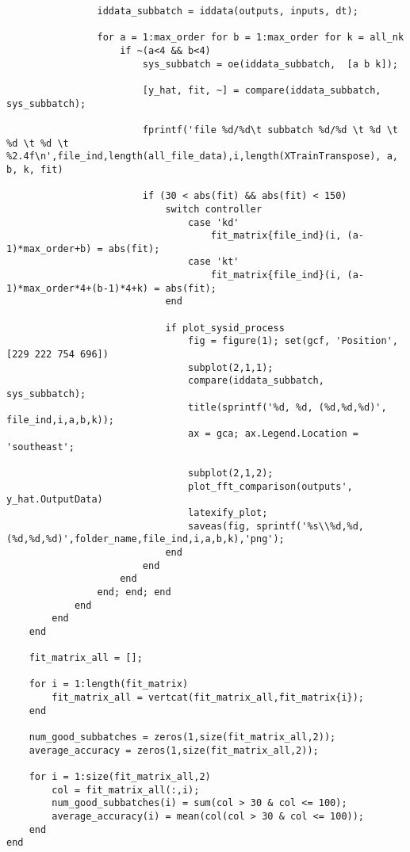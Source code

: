 \begin{lstlisting}
                iddata_subbatch = iddata(outputs, inputs, dt);
    
                for a = 1:max_order for b = 1:max_order for k = all_nk
                    if ~(a<4 && b<4)
                        sys_subbatch = oe(iddata_subbatch,  [a b k]);
    
                        [y_hat, fit, ~] = compare(iddata_subbatch, sys_subbatch);
    
                        fprintf('file %d/%d\t subbatch %d/%d \t %d \t %d \t %d \t %2.4f\n',file_ind,length(all_file_data),i,length(XTrainTranspose), a, b, k, fit)
    
                        if (30 < abs(fit) && abs(fit) < 150)
                            switch controller
                                case 'kd'
                                    fit_matrix{file_ind}(i, (a-1)*max_order+b) = abs(fit);
                                case 'kt'
                                    fit_matrix{file_ind}(i, (a-1)*max_order*4+(b-1)*4+k) = abs(fit);
                            end
    
                            if plot_sysid_process
                                fig = figure(1); set(gcf, 'Position', [229 222 754 696])
                                subplot(2,1,1);
                                compare(iddata_subbatch, sys_subbatch);
                                title(sprintf('%d, %d, (%d,%d,%d)', file_ind,i,a,b,k));
                                ax = gca; ax.Legend.Location = 'southeast';
    
                                subplot(2,1,2);
                                plot_fft_comparison(outputs', y_hat.OutputData)
                                latexify_plot;
                                saveas(fig, sprintf('%s\\%d,%d,(%d,%d,%d)',folder_name,file_ind,i,a,b,k),'png');
                            end
                        end
                    end
                end; end; end
            end
        end
    end
    
    fit_matrix_all = [];
    
    for i = 1:length(fit_matrix)
        fit_matrix_all = vertcat(fit_matrix_all,fit_matrix{i});
    end
    
    num_good_subbatches = zeros(1,size(fit_matrix_all,2));
    average_accuracy = zeros(1,size(fit_matrix_all,2));
    
    for i = 1:size(fit_matrix_all,2)
        col = fit_matrix_all(:,i);
        num_good_subbatches(i) = sum(col > 30 & col <= 100);
        average_accuracy(i) = mean(col(col > 30 & col <= 100));
    end
end


\end{lstlisting}
